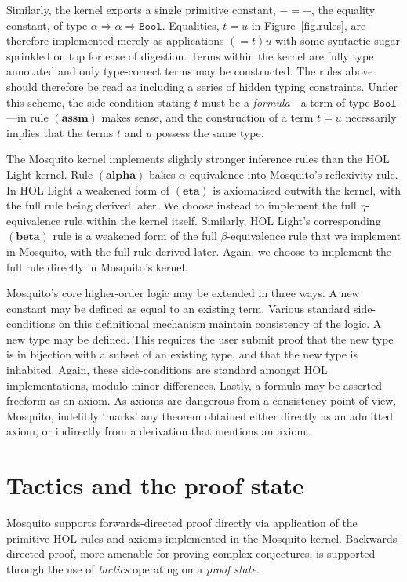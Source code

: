 \documentclass{llncs}
\newcommand{\mosquito}{Mosquito\xspace}
\newcommand{\rulefont}[1]{\ensuremath{(\mathbf{#1})}}
\begin{document}
Similarly, the kernel exports a single primitive constant, $- = -$, the equality constant, of type $\alpha \Rightarrow \alpha \Rightarrow \mathtt{Bool}$.
Equalities, $t = u$ in Figure~\ref{fig.rules}, are therefore implemented merely as applications $(= t) u$ with some syntactic sugar sprinkled on top for ease of digestion.
Terms within the kernel are fully type annotated and only type-correct terms may be constructed.
The rules above should therefore be read as including a series of hidden typing constraints.
Under this scheme, the side condition stating $t$ must be a \emph{formula}---a term of type $\mathtt{Bool}$---in rule \rulefont{assm} makes sense, and the construction of a term $t = u$ necessarily implies that the terms $t$ and $u$ possess the same type.

The \mosquito kernel implements slightly stronger inference rules than the HOL Light kernel.
Rule \rulefont{alpha} bakes $\alpha$-equivalence into \mosquito's reflexivity rule.
In HOL Light a weakened form of \rulefont{eta} is axiomatised outwith the kernel, with the full rule being derived later.
We choose instead to implement the full $\eta$-equivalence rule within the kernel itself.
Similarly, HOL Light's corresponding \rulefont{beta} rule is a weakened form of the full $\beta$-equivalence rule that we implement in \mosquito, with the full rule derived later.
Again, we choose to implement the full rule directly in \mosquito's kernel.

\mosquito's core higher-order logic may be extended in three ways.
A new constant may be defined as equal to an existing term.
Various standard side-conditions on this definitional mechanism maintain consistency of the logic.
A new type may be defined.
This requires the user submit proof that the new type is in bijection with a subset of an existing type, and that the new type is inhabited.
Again, these side-conditions are standard amongst HOL implementations, modulo minor differences.
Lastly, a formula may be asserted freeform as an axiom.
As axioms are dangerous from a consistency point of view, \mosquito, indelibly `marks' any theorem obtained either directly as an admitted axiom, or indirectly from a derivation that mentions an axiom.

\section{Tactics and the proof state}
\label{sect.tactics.proof.state}

Mosquito supports forwards-directed proof directly via application of the primitive HOL rules and axioms implemented in the Mosquito kernel.
Backwards-directed proof, more amenable for proving complex conjectures, is supported through the use of \emph{tactics} operating on a \emph{proof state}.
\end{document}
